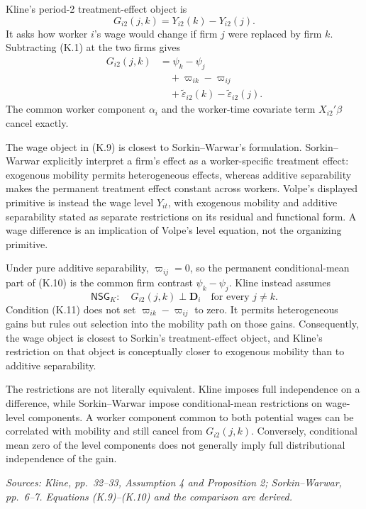 \documentclass[11pt]{article}
\begin{document}
Kline's period-2 treatment-effect object is
\[
G_{i2}(j,k)
=
Y_{i2}(k)-Y_{i2}(j).
\tag{K.9}
\]
It asks how worker \(i\)'s wage would change if firm \(j\) were replaced by
firm \(k\).  Subtracting (K.1) at the two firms gives
\[
\begin{aligned}
G_{i2}(j,k)
&=
\psi_k-\psi_j\\
&\quad+
\varpi_{ik}-\varpi_{ij}\\
&\quad+
\widetilde\varepsilon_{i2}(k)
-\widetilde\varepsilon_{i2}(j).
\end{aligned}
\tag{K.10}
\]
The common worker component \(\alpha_i\) and the worker-time covariate term
\(X_{i2}'\beta\) cancel exactly.

The wage object in (K.9) is closest to Sorkin--Warwar's formulation.
Sorkin--Warwar explicitly interpret a firm's effect as a worker-specific
treatment effect: exogenous mobility permits heterogeneous effects, whereas
additive separability makes the permanent treatment effect constant across
workers.  Volpe's displayed primitive is instead the wage level
\(Y_{it}\), with exogenous mobility and additive separability stated as
separate restrictions on its residual and functional form.  A wage
difference is an implication of Volpe's level equation, not the organizing
primitive.

Under pure additive separability, \(\varpi_{ij}=0\), so the permanent
conditional-mean part of (K.10) is the common firm contrast
\(\psi_k-\psi_j\).  Kline instead assumes
\[
\mathsf{NSG}_{K}:
\quad
G_{i2}(j,k)\perp\mathbf D_i
\quad\text{for every }j\neq k.
\tag{K.11}
\]
Condition (K.11) does not set
\(\varpi_{ik}-\varpi_{ij}\) to zero.  It permits heterogeneous gains but
rules out selection into the mobility path on those gains.  Consequently,
the wage object is closest to Sorkin's treatment-effect object, and Kline's
restriction on that object is conceptually closer to exogenous mobility
than to additive separability.

The restrictions are not literally equivalent.  Kline imposes full
independence on a difference, while Sorkin--Warwar impose conditional-mean
restrictions on wage-level components.  A worker component common to both
potential wages can be correlated with mobility and still cancel from
\(G_{i2}(j,k)\).  Conversely, conditional mean zero of the level components
does not generally imply full distributional independence of the gain.

\textit{Sources: Kline, pp.\ 32--33, Assumption 4 and Proposition 2;
Sorkin--Warwar, pp.\ 6--7.  Equations (K.9)--(K.10) and the comparison are
derived.}
\end{document}
